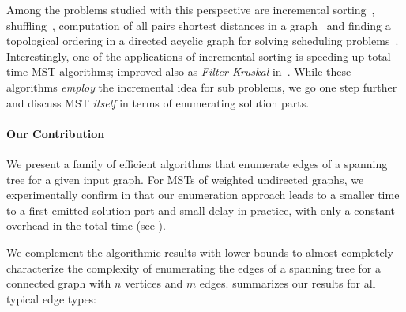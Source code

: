 \documentclass[a4paper, USenglish, cleveref, autoref, thm-restate]{lipics-v2021}
\begin{document}
Among the problems studied with this perspective are incremental sorting~\cite{paredesOptimalIncrementalSorting2006,navarroSortingHeapsMinimum2010}, shuffling~\cite{carmeliAnsweringUnionsConjunctive2022}, computation of all pairs shortest distances in a graph~\cite{caselShortestDistancesEnumeration2024} and finding a topological ordering in a directed acyclic graph for solving scheduling problems~\cite{neubertIncrementalOrderingScheduling2024}.
Interestingly, one of the applications of incremental sorting is speeding up total-time MST algorithms; improved also as \emph{Filter Kruskal} in~\cite{osipovFilterKruskalMinimumSpanning2009}.
While these algorithms \textit{employ} the incremental idea for sub problems, we go one step further and discuss MST \textit{itself} in terms of enumerating solution parts.

\paragraph*{Our Contribution}
We present a family of efficient algorithms that enumerate edges of a spanning tree for a given input graph.
For MSTs of weighted undirected graphs, we experimentally confirm in  that our enumeration approach leads to a smaller time to a first emitted solution part and small delay in practice, with only a constant overhead in the total time (see ).

We complement the algorithmic results with lower bounds to almost completely characterize the complexity of enumerating the edges of a spanning tree for a connected graph with $n$ vertices and $m$ edges.
 summarizes our results for all typical edge types:
\end{document}
